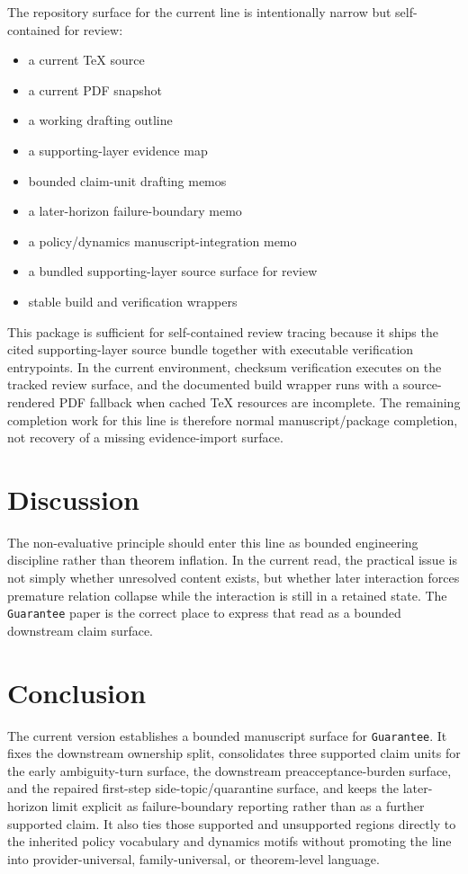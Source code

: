 \documentclass[11pt]{article}
\begin{document}
The repository surface for the current line is intentionally narrow but
self-contained for review:
\begin{itemize}
\item a current TeX source
\item a current PDF snapshot
\item a working drafting outline
\item a supporting-layer evidence map
\item bounded claim-unit drafting memos
\item a later-horizon failure-boundary memo
\item a policy/dynamics manuscript-integration memo
\item a bundled supporting-layer source surface for review
\item stable build and verification wrappers
\end{itemize}

This package is sufficient for self-contained review tracing because it ships
the cited supporting-layer source bundle together with executable verification
entrypoints. In the current environment, checksum verification executes on the
tracked review surface, and the documented build wrapper runs with a
source-rendered PDF fallback when cached TeX resources are incomplete. The
remaining completion work for this line is therefore normal manuscript/package
completion, not recovery of a missing evidence-import surface.

\section{Discussion}

The non-evaluative principle should enter this line as bounded engineering
discipline rather than theorem inflation. In the current read, the practical issue
is not simply whether unresolved content exists, but whether later interaction
forces premature relation collapse while the interaction is still in a retained
state. The \texttt{Guarantee} paper is the correct place to express that read as
a bounded downstream claim surface.

\section{Conclusion}

The current version establishes a bounded manuscript surface for
\texttt{Guarantee}. It fixes the downstream ownership split, consolidates three
supported claim units for the early ambiguity-turn surface, the downstream
preacceptance-burden surface, and the repaired first-step side-topic/quarantine
surface, and keeps the later-horizon limit explicit as failure-boundary
reporting rather than as a further supported claim. It also ties those
supported and unsupported regions directly to the inherited policy vocabulary
and dynamics motifs without promoting the line into provider-universal,
family-universal, or theorem-level language.
\end{document}
